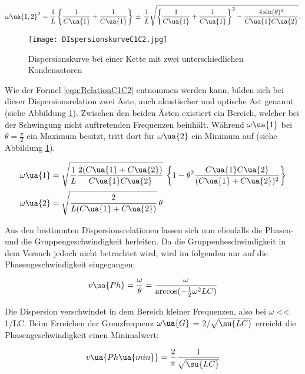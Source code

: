 \begin{equation}
  \omega\ua{1,2}^2 = \frac{1}{L} \left\{ \frac{1}{C\ua{1}} + \frac{1}{C\ua{1}}
  \right\} \, \pm \, \frac{1}{L} \sqrt{ \left\{ \frac{1}{C\ua{1}} + \frac{1}{C\ua{1}}
  \right\}^2  - \frac{4\sin(\theta)^2}{C\ua{1}C\ua{2}}} .
  \label{eqn:RelationC1C2}
\end{equation}

\begin{figure}
  \texttt{[image: DIspersionskurveC1C2.jpg]}
  \caption{Dispersionskurve bei einer Kette mit zwei unterschiedlichen Kondensatoren \cite{anleitung01}}
  \label{fig:RelationC12}
\end{figure}

Wie der Formel \eqref{eqn:RelationC1C2} entnommen werden kann, bilden sich bei
dieser Dispersionsrelation zwei Äste, auch akustischer und optische Ast genannt
(siehe Abbildung \ref{fig:RelationC12}). Zwischen den beiden Ästen existiert ein Bereich, welcher
bei der Schwingung nicht auftretenden Frequenzen beinhält. Während $\omega\ua{1}$
bei $\theta = \frac{\pi}{2}$ ein Maximum besitzt, tritt dort für $\omega\ua{2}$
ein Minimum auf (siehe Abbildung \ref{fig:RelationC12}).


\begin{align}
  \omega\ua{1} &= \sqrt{ \frac{1}{L} \frac{2(C\ua{1} + C\ua{2})}{C\ua{1}C\ua{2}}} \,
  \left\{ 1 - \theta^2 \frac{C\ua{1}C\ua{2}}{(C\ua{1} + C\ua{2})^2} \right\} \\
  \omega\ua{2} &= \sqrt{ \frac{2}{L(C\ua{1} + C\ua{2})}} \, \theta
\end{align}

Aus den bestimmten Dispersionsrelationen lassen sich nun ebenfalls die Phasen- und
die Gruppengeschwindigkeit herleiten. Da die Gruppenheschwindigkeit in dem Versuch
jedoch nicht betrachtet wird, wird im folgenden nur auf die Phasengeschwindigkeit
eingegangen:

\begin{equation}
  v\ua{Ph} = \frac{\omega}{\theta} = \frac{\omega}{\arccos(-\frac{1}{2}\omega^2LC)}
\end{equation}

Die Dispersion verschwindet in dem Bereich kleiner Frequenzen, also bei $\omega$
<< 1/LC. Beim Erreichen der Grenzfrequenz $\omega\ua{G}$ = 2/$\sqrt{\su{LC}}$ erreicht
die Phasengeschwindigkeit einen Minimalwert:

\begin{equation}
  v\ua{Ph\ua{min}} =  \frac{2}{\pi} \frac{1}{\sqrt{\su{LC}}}
  \label{eqn:Phasengeschwindigkeit}
\end{equation}

